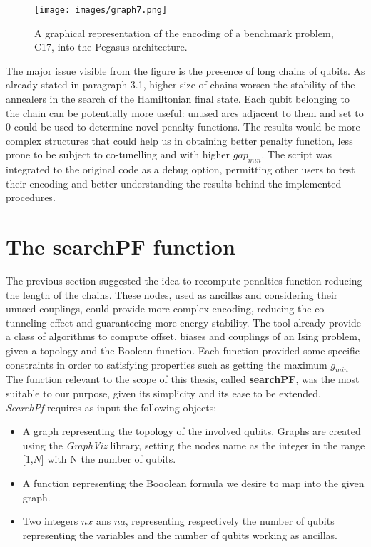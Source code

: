 \begin{figure}[]
	\begin{center}
	\texttt{[image: images/graph7.png]}
	\caption{A graphical representation of the encoding of a benchmark problem, C17, into the Pegasus architecture.}
	\end{center}
\end{figure}

The major issue visible from the figure is the presence of long chains of qubits. As already stated in paragraph 3.1, higher size of chains worsen the stability of the annealers in the search of the Hamiltonian final state. Each qubit belonging to the chain can be potentially more useful: unused arcs adjacent to them and set to 0 could be used to determine novel penalty functions. The results would be more complex structures that could help us in obtaining better penalty function, less prone to be subject to co-tunelling and with higher $gap_{min}$.
The script was integrated to the original code as a debug option, permitting other users to test their encoding and better understanding the results behind the implemented procedures.

\section{The searchPF function}

The previous section suggested the idea to recompute penalties function reducing the length of the chains. These nodes, used as ancillas and considering their unused couplings, could provide more complex encoding, reducing the co-tunneling effect and guaranteeing more energy stability. The tool already provide a class of algorithms to compute offset, biases and couplings of an Ising problem, given a topology and the Boolean function. Each function provided some specific constraints in order to satisfying properties such as getting the maximum $g_{min}$  The function relevant to the scope of this thesis, called \textbf{searchPF}, was the most suitable to our purpose, given its simplicity and its ease to be extended. \\
\textit{SearchPf} requires as input the following objects:

\begin{itemize}
    \item A graph representing the topology of the involved qubits. Graphs are created using the \textit{GraphViz} library, setting the nodes name as the integer in the range [1,$N$] with N the number of qubits.
    \item A function representing the Booolean formula we desire to map into the given graph.
    \item Two integers $nx$ ans $na$, representing respectively the number of qubits representing the variables and the number of qubits working as ancillas.
\end{itemize}

